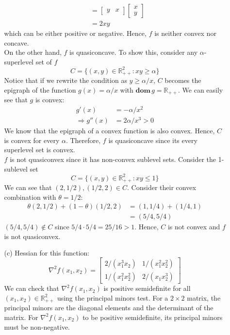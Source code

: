 \documentclass{article}
\begin{document}
\begin{itemize}
\begin{itemize}
\begin{align*}
      &= \begin{bmatrix} y & x \end{bmatrix} \begin{bmatrix} x \\ y \end{bmatrix} \\
      &= 2xy
    \end{align*}
    which can be either positive or negative. Hence, $f$ is neither convex nor concave. \\
    On the other hand, $f$ is quasiconcave. To show this, consider any $\alpha$-superlevel set of $f$
    \[ C = \{(x, y) \in \mathbb{R}_{++}^2 : xy \ge \alpha\} \]
    Notice that if we rewrite the condition as $y \ge \alpha / x$, $C$ becomes the epigraph of the function $g(x) = \alpha / x$ with $\mathbf{dom}\,g = \mathbb{R}_{++}$. We can easily see that $g$ is convex:
    \begin{align*}
      g'(x) &= -\alpha / x^2 \\
      \Rightarrow g''(x) &= 2 \alpha / x^3 > 0
    \end{align*}
    We know that the epigraph of a convex function is also convex. Hence, $C$ is convex for every $\alpha$. Therefore, $f$ is quasiconcave since its every superlevel set is convex. \\
    $f$ is not quasiconvex since it has non-convex sublevel sets. Consider the 1-sublevel set
    \[ C = \{(x, y) \in \mathbb{R}_{++}^2 : xy \le 1\} \]
    We can see that $(2, 1/2), (1/2, 2) \in C$. Consider their convex combination with $\theta = 1/2$:
    \begin{align*}
      \theta (2, 1/2) + (1 - \theta) (1/2, 2) &= (1, 1/4) + (1/4, 1) \\
      &= (5/4, 5/4)
    \end{align*}
    $(5/4, 5/4) \notin C$ since $5/4 \cdot 5/4 = 25/16 > 1$. Hence, $C$ is not convex and $f$ is not quasiconvex.
    \item[(c)] Hessian for this function:
    \[ \nabla^2 f(x_1, x_2) = \begin{bmatrix} 2/(x_1^3x_2) & 1/(x_1^2x_2^2) \\
      1/(x_1^2x_2^2) & 2/(x_1x_2^3) \end{bmatrix} \]
    We can check that $\nabla^2 f(x_1, x_2)$ is positive semidefinite for all $(x_1, x_2) \in \mathbb{R}_{++}^2$ using the principal minors test.
    For a $2 \times 2$ matrix, the principal minors are the diagonal elements and the determinant of the matrix.
    For $\nabla^2 f(x_1, x_2)$ to be positive semidefinite, its principal minors must be non-negative.

\end{itemize}
\end{itemize}
\end{document}
